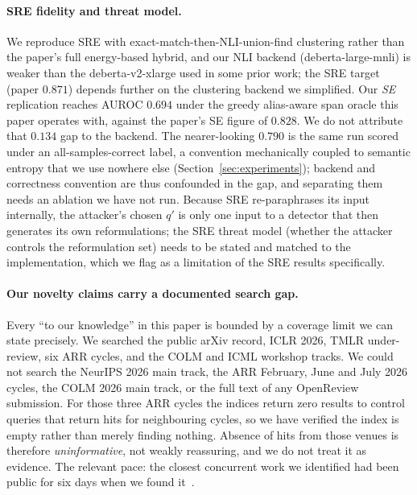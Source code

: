 \paragraph{SRE fidelity and threat model.}
We reproduce SRE with exact-match-then-NLI-union-find clustering rather than the paper's full
energy-based hybrid, and our NLI backend (deberta-large-mnli) is weaker than the
deberta-v2-xlarge used in some prior work; the SRE target (paper $0.871$) depends further on
the clustering backend we simplified. Our \emph{SE} replication reaches AUROC $0.694$ under the
greedy alias-aware span oracle this paper operates with, against the paper's SE figure of
$0.828$. We do not attribute that $0.134$ gap to the backend. The nearer-looking $0.790$ is the
same run scored under an all-samples-correct label, a convention mechanically coupled to
semantic entropy that we use nowhere else (Section~\ref{sec:experiments}); backend and
correctness convention are thus confounded in the gap, and separating them needs an ablation we
have not run. Because SRE re-paraphrases its input internally, the attacker's chosen $q'$ is
only one input to a detector that then generates its own reformulations; the SRE threat model
(whether the attacker controls the reformulation set) needs to be stated and matched to the
implementation, which we flag as a limitation of the SRE results specifically.

\paragraph{Our novelty claims carry a documented search gap.}
Every ``to our knowledge'' in this paper is bounded by a coverage limit we can state precisely.
We searched the public arXiv record, ICLR 2026, TMLR under-review, six ARR cycles, and the COLM
and ICML workshop tracks. We could not search the NeurIPS 2026 main track, the ARR February,
June and July 2026 cycles, the COLM 2026 main track, or the full text of any OpenReview
submission. For those three ARR cycles the indices return zero results to control queries that
return hits for neighbouring cycles, so we have verified the index is empty rather than merely
finding nothing. Absence of hits from those venues is therefore \emph{uninformative}, not
weakly reassuring, and we do not treat it as evidence. The relevant pace: the closest
concurrent work we identified had been public for six days when we found
it~\citep{khanmohammadi2026answerpreserving}.

